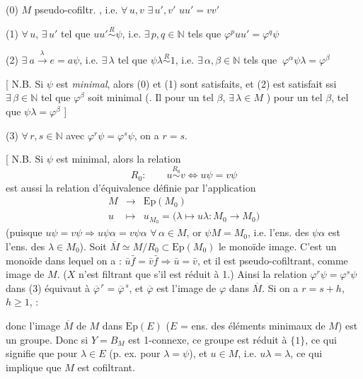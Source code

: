 \documentclass[11pt,a4paper]{article}
\begin{document}
(0) $M$ pseudo-cofiltr. \ill{}, i.e. $\forall\, u,v$ $\exists\, u',v'$ \ill{}
$uu' = vv'$

(1) $\forall\, u$, $\exists\, u'$ tel que $uu' \overset{R}{\sim} \psi$, i.e.
$\exists\, p,q \in \mathbb{N}$ tels que $\varphi^{p}uu' = \varphi^{q}\psi$

(2) $\exists\ a \xrightarrow{\ \lambda\ } e = a\psi$, i.e. $\exists\, \lambda$
tel que $\psi\lambda \overset{R}{\sim} 1$, i.e.
$\exists\, \alpha,\beta \in \mathbb{N}$ tels que
$\boxed{\ \varphi^{\alpha}\psi\lambda = \varphi^{\beta}\ }$

[ N.B. Si $\psi$ est \emph{minimal}, alors (0) et (1) sont satisfaits, et (2) est
satisfait ssi \struck{\ill{}} $\exists\, \beta \in \mathbb{N}$ tel que
$\varphi^{\beta}$ soit minimal (. Il \ill{} pour un tel $\beta$,
$\exists\, \lambda \in M$ \ill{}) pour un tel $\beta$, tel que
$\psi\lambda = \varphi^{\beta}$ ]

(3) $\forall\, r,s \in \mathbb{N}$ avec $\varphi^{r}\psi = \varphi^{s}\psi$, on a
$r = s$.

[ N.B. Si $\psi$ est minimal, alors la relation
\[
  R_0 : \qquad u \overset{R_0}{\sim} v \iff u\psi = v\psi
\]
est aussi la relation d'équivalence définie par l'application
\[
  \begin{array}{rcl}
    M &\longrightarrow& \mathrm{Ep}(M_0) \\
    u &\longmapsto& u_{M_0} = \bigl(\lambda \mapsto u\lambda : M_0 \to M_0\bigr)
  \end{array}
\]
(puisque $u\psi = v\psi \Longrightarrow u\psi\alpha = v\psi\alpha$
$\forall\, \alpha \in M$, or $\psi M = M_0$, i.e. l'ens. des $\psi\alpha$ est
l'ens. des $\lambda \in M_0$). Soit
$\overline{M} \simeq M/R_0 \subset \mathrm{Ep}(M_0)$ le monoïde image.
 C'est un monoïde \ill{} dans lequel on a :
$\bar{u}\bar{f} = \bar{v}\bar{f} \Longrightarrow \bar{u} = \bar{v}$, et il est
pseudo-cofiltrant, comme image de $M$. ($X$ n'est filtrant que s'il est réduit à
1.) Ainsi la relation $\varphi^{r}\psi = \varphi^{s}\psi$ dans (3) équivaut à
$\overline{\varphi}^{\,r} = \overline{\varphi}^{\,s}$, et $\overline{\varphi}$
est l'image de $\varphi$ dans $\overline{M}$. Si on a $r = s+h$, $h \ge 1$,
\struck{\ill{}} :


donc l'image $\overline{M}$ de $M$ dans $\mathrm{Ep}(E)$ ($E$ = ens. des éléments
minimaux de $M$) est un groupe. Donc si $Y = B_M$ est 1-connexe, ce groupe est
réduit à $\{1\}$, ce qui signifie que pour \struck{\ill{}} $\lambda \in E$
(p. ex. pour $\lambda = \psi$), \struck{\ill{}} et $u \in M$, i.e. \ill{}
$u\lambda = \lambda$, ce qui implique que $M$ est cofiltrant.
\end{document}
